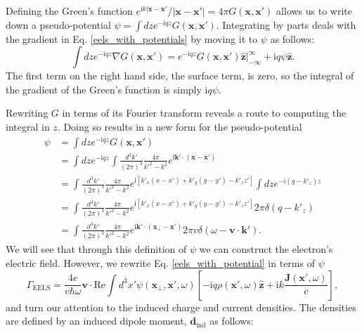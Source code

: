 \documentclass [11pt, proquest] {uwthesis}[2016/11/22]
\begin{document}
Defining the Green's function $e^{\textrm{i}k|\textbf{x}-\textbf{x}'}/|\textbf{x}-\textbf{x}'| = 4\pi G(\textbf{x},\textbf{x}')$ allows us to write down a pseudo-potential $\psi = \int dz e^{-\textrm{i}qz} G(\textbf{x},\textbf{x}')$. Integrating by parts deals with the gradient in Eq. \ref{eels_with_potentials} by moving it to $\psi$ as follows: 
\begin{equation}
\int dz e^{-\textrm{i}qz} \nabla G(\textbf{x},\textbf{x}') = e^{-\textrm{i}qz} G(\textbf{x},\textbf{x}') \hat{\textbf{z}} \Big|_{-\infty}^{\infty} + \textrm{i}q \psi \hat{\textbf{z}}.
\label{psi_integral}
\end{equation}
The first term on the right hand side, the surface term, is zero, so the integral of the gradient of the Green's function is simply $\textrm{i}q\psi$.

Rewriting $G$ in terms of its Fourier transform reveals a route to computing the integral in $z$. Doing so results in a new form for the pseudo-potential
\begin{equation}
\begin{aligned}
\psi &= \int dz e^{-\textrm{i}qz} G(\textbf{x},\textbf{x}')\\ 
&= \int dz e^{-\textrm{i}qz} \int \frac{d^3k'}{(2\pi)^3} \frac{4\pi}{k'^2 - k^2} e^{\textrm{i}\textbf{k}'\cdot(\textbf{x}-\textbf{x}')}\\
&= \int \frac{d^3k'}{(2\pi)^3} \frac{4\pi}{k'^2 - k^2} e^{\textrm{i}[k'_x(x-x')+k'_y(y-y')-k'_zz']} \int dz e^{-\textrm{i}(q-k'_z)z}\\
&= \int \frac{d^3k'}{(2\pi)^3} \frac{4\pi}{k'^2 - k^2} e^{\textrm{i}[k'_x(x-x')+k'_y(y-y')-k'_zz']} 2\pi\delta(q-k'_z)\\
&= \int \frac{d^3k'}{(2\pi)^3} \frac{4\pi}{k'^2 - k^2} e^{\textrm{i}\textbf{k}'\cdot(\textbf{x}_{\perp}-\textbf{x}')} 2\pi v \delta(\omega-\textbf{v}\cdot\textbf{k}').
\label{psi_k_space}
\end{aligned}
\end{equation}
We will see that through this definition of $\psi$ we can construct the electron's electric field. However, we rewrite Eq. \ref{eels_with_potential} in terms of $\psi$
\begin{equation}
\Gamma_{\textrm{EELS}} = \frac{4e}{v\hbar\omega}\textbf{v}\cdot\textrm{Re}\int d^3x' \psi(\textbf{x}_{\perp},\textbf{x}',\omega) \left[-\textrm{i}q\rho(\textbf{x}',\omega)\hat{\textbf{z}} + \textrm{i}k\frac{\textbf{J}(\textbf{x}',\omega)}{c}\right],
\label{eels_with_psi}
\end{equation}
and turn our attention to the induced charge and current densities. The densities are defined by an induced dipole moment, $\textbf{d}_{\textrm{ind}}$ as follows:
\end{document}
